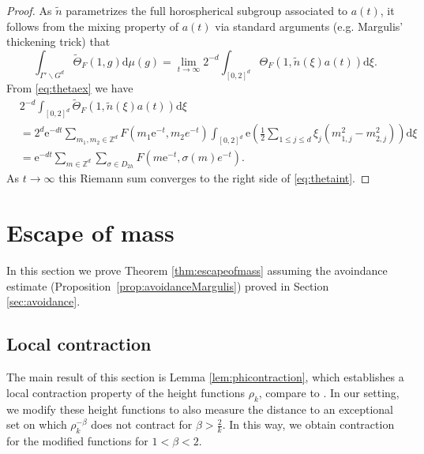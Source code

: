 \documentclass[12pt]{amsart}
\theoremstyle{definition}
\theoremstyle{remark}
\numberwithin{equation}{section}
\newcommand{\dd}{\mathrm{d}}
\newcommand{\Z}{\mathbb{Z}}
\newcommand{\e}{\mathrm{e}}
\begin{document}
\begin{proof}
  As $\tilde n$ parametrizes the full horospherical subgroup associated to $a(t)$, it follows from the mixing property of $a(t)$ via standard arguments (e.g. Margulis' thickening trick) that
  \begin{equation}
    \label{eq:fullhorosphere}
    \int_{\Gamma' \backslash G^d} \widetilde\Theta_F(1, g) \dd \mu(g) = \lim_{t\to \infty} 2^{-d} \int_{[0,2]^d} \Theta_F(1, \tilde n(\xi)a(t)) \dd \xi.
  \end{equation}
  From \eqref{eq:thetaex} we have
  \begin{equation}
  \begin{split}
    \label{eq:horosphereaverage}
    & 2^{-d} \int_{[0,2]^d} \widetilde\Theta_F(1, \tilde n(\xi)a(t)) \dd \xi \\
    & = 2^{d}\e^{-dt}\sum_{m_1, m_2 \in \Z^d} F(m_1\e^{-t}, m_2e^{-t}) \int_{[0,2]^d} \e(\tfrac{1}{2} \sum_{1\leq j\leq d} \xi_j (m_{1,j}^2 - m_{2,j}^2)) \dd \xi \\
    & = \e^{-dt}\sum_{m \in \Z^d}\sum_{\sigma\in D_{2h}} F(m\e^{-t},\sigma(m) e^{-t}).
  \end{split}
  \end{equation}
  As $t\to \infty$ this Riemann sum converges to the right side of \eqref{eq:thetaint}.
\end{proof}

\section{Escape of mass}
\label{sec:escape}

In this section we prove Theorem \ref{thm:escapeofmass} assuming the avoindance estimate (Proposition~\ref{prop:avoidanceMargulis}) proved in Section \ref{sec:avoidance}.


\subsection{Local contraction}
\label{sec:loccontraction}

The main result of this section is Lemma \ref{lem:phicontraction}, which establishes a local contraction property of the height functions $\rho_k$, compare to \cite[Lemma~5.1]{KleinbockMargulis1999}.
In our setting, we modify these height functions to also measure the distance to an exceptional set on which $\rho_k^{-\beta}$ does not contract for $\beta > \tfrac{2}{k}$.
In this way, we obtain contraction for the modified functions for $1 < \beta < 2$.
\end{document}
